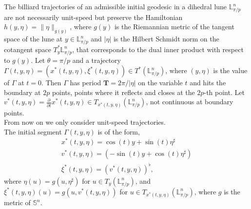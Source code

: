 \documentclass[11pt,a4paper,times]{amsart}
\theoremstyle{plain}
\theoremstyle{definition}
\numberwithin{equation}{section}
\newcommand{\lune}[2]{\mathbb{L}^{#1}_{#2}}
\begin{document}
{The billiard trajectories of an admissible initial  geodesic in a dihedral lune $\lune{n}{\pi/p}$ are not necessarily unit-speed but preserve the Hamiltonian $h(y, \eta)=\|\eta\|_{g(y)}$, where $g(y)$ is the Riemannian metric of the tangent space of the lune at $y\in \lune{n}{\pi/p}$ and $|\eta|$ is the Hilbert Schmidt norm on  the cotangent space $T^*_y \lune{n}{\pi/p}$, that corresponds to the dual inner product with respect to $g(y)$. Let $\theta=\pi/p$ and a trajectory
$\Gamma(t,y, \eta)=(x^*(t,y, \eta), \xi^*(t,y,\eta))\in T^*(\lune{n}{\pi/p})$, where $(y,\eta)$ is the value of $\Gamma$ at $t=0$.
Then $\Gamma$  has period $\boldsymbol{T}=2\pi/|\eta|$ on the variable $t$ and hits the boundary at $2p$ points, points where it reflects and closes at the $2p$-th point.
Let $v^*(t,y,\eta)=\frac{\partial}{\partial t}x^*(t,y,\eta)\in T_{x^*(t,y,\eta)}(\lune{n}{\pi/p})$, not continuous at  boundary points.\\

From now on we only consider unit-speed trajectories.\\

 The initial segment $\Gamma(t,y,\eta)$ is of the form, 
\begin{equation}\label{inicialA}\begin{array}{l}
x^*(t,y,\eta)=\cos(t)y+\sin(t)\eta^{\sharp}\\
v^*(t,y,\eta)=\left(-\sin(t)y+\cos(t)\eta^{\sharp}\right)\\
\xi^*(t,y,\eta)=(v^*(t,y,\eta))^{\flat},
\end{array}
\end{equation}
where $\eta(u)=g(u, \eta^{\sharp})$ for $u\in T_y(\lune{n}{\pi/p})$, and
 $\xi^*(t,y,\eta)(u)=g(u, v^*(t,y, \eta))$
 for $u\in T_{x^*(t,y,\eta)}(\lune{n}{\pi/p})$,
  where $g$ is the metric of $\mathbb{S}^n$.

}
\end{document}

